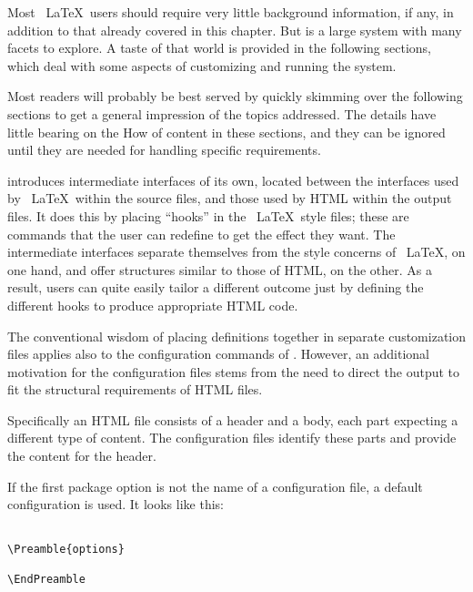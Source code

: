 

Most \ \LaTeX\  users should require very little background information,
if any, in addition to that already covered in this chapter. But \texht 
is a large system with many facets to explore. A taste of that world is
provided in the following sections, which deal with some aspects of
customizing and running the system. 

Most readers will probably be best served by quickly skimming over the
following sections to get a general impression of the topics addressed.
The details have little bearing on the How of content in these sections,
and they can be ignored until they are needed for handling specific
requirements. 


\texht introduces intermediate interfaces of its own, located between
the interfaces used by \ \LaTeX\  within the source files, and those
used by HTML within the output files. It does this by placing ``hooks''
in the \ \LaTeX\  style files; these are commands that the user can
redefine to get the effect they want. The intermediate interfaces
separate themselves from the style concerns of \ \LaTeX, on one hand,
and offer structures similar to those of HTML, on the other. As a
result, users can quite easily tailor a different outcome just by
defining the different hooks to produce appropriate HTML code. 

The conventional wisdom of placing definitions together in separate
customization files applies also to the configuration commands of
\texht. However, an additional motivation for the configuration files stems from the need to direct 
the output to fit the structural requirements of HTML files. 

Specifically an HTML file consists of a header and a body, each part expecting 
a different type of content. The configuration files identify these parts and provide 
the content for the header. 


If the first package option is not the name of a configuration file, a
default configuration is used. It looks like this: 

\begin{lstlisting}

\Preamble{options} 
 
\EndPreamble 

\end{lstlisting}


